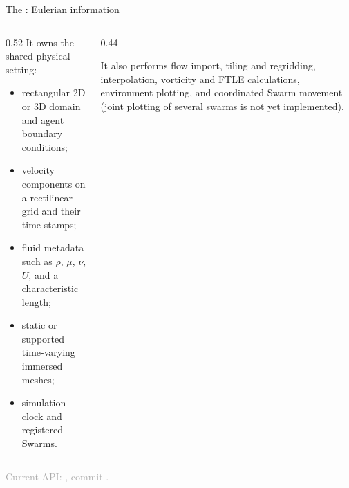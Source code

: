 \documentclass[aspectratio=169,11pt]{beamer}
\newcommand{\sourcecredit}[1]{\vfill\begin{flushright}\tiny\textcolor{DarkGray}{#1}\end{flushright}}
\begin{document}
\begin{frame}{The : Eulerian information}
\begin{columns}[T,onlytextwidth]
  \begin{column}{0.52\textwidth}
    It owns the shared physical setting:
    \begin{itemize}
      \item rectangular 2D or 3D domain and agent boundary conditions;
      \item velocity components on a rectilinear grid and their time stamps;
      \item fluid metadata such as $\rho$, $\mu$, $\nu$, $U$, and a characteristic length;
      \item static or supported time-varying immersed meshes;
      \item simulation clock and registered Swarms.
    \end{itemize}
  \end{column}
  \begin{column}{0.44\textwidth}
    \begin{block}{It also performs}
      flow import, tiling and regridding, interpolation, vorticity and FTLE calculations, environment plotting, and coordinated Swarm movement (joint plotting of several swarms is not yet implemented).
    \end{block}
  \end{column}
\end{columns}
\sourcecredit{Current API: , commit \code{a1c2128}.}
\end{frame}
\end{document}
